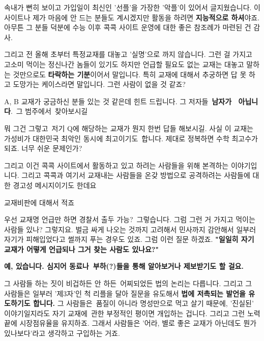 속내가 뻔히 보이고 가입일이 최신인 '선플'을 가장한 '악플'이 있어서 글지웠습니다.
이 사이트나 제가 마음에 안 드는 분들도 계시겠지만 활동을 하려면 \textbf{지능적으로 하셔}야죠.
아무튼 그 분들 덕분에 수능 이후 콕콕 사이트 운영에 대한 좋은 참조례가 마련된 건 감사.
\vspace{5mm}

그리고 전 올해 초부터 특정교재를 대놓고 '실명'으로 까지 않습니다. 그런 걸 가지고 고소미 먹이는 정신나간 놈들이 있기도 하지만
언급할 필요도 없는 교재는 대놓고 말하는 것만으로도 \textbf{타락하는 기분}이어서 말입니다.
특히 교재에 대해서 추궁하면 답 못 하고 도망가는 케이스라면 말입니다. 그런 사람이 없을 것 같죠?
\vspace{5mm}

A, B 교재가 궁금하신 분들 있는 것 같은데 힌트 드립니다.
그 저자들 \textbf{남자가  아닙니다}. 그 범주에서 찾아보시길
\vspace{5mm}

뭐 그건 그렇고 저기 Q에 해당하는 교재가 뭔지 한번 답들 해보시길.
사실 이 교재는 가성비가 대한민국 최악인 동시에 최고이기도 합니다. 제대로 정복하면 수학 최고수가 되죠.
너무 쉬운 문제인가?
\vspace{5mm}

그리고 이건 콕콕 사이트에서 활동하고 있고 하려는 사람들을 위해 본격하는 이야기입니다.
그리고 콕콕과 여기서 교재내는 사람들을 온갖 방법으로 공격하려는 사람들에 대한 경고성 메시지이기도 한데요
\vspace{5mm}

교재비판에 대해서 적죠
\vspace{5mm}

우선 교재명 언급만 하면 경찰서 출두 가능? 그렇습니다.
그럼 그런 거 가지고 먹이는 사람들 있나? 그렇지요.
벌금 싸게 나오는 것까지 고려해서 민사까지 감안해서 일부러 자기가 피해입었다고 썰까지 푸는 경우도 있죠.
그럼 이런 질문 하겠죠. \textbf{"일일히 자기 교재가 어떻게 언급되나 그거 찾는 사람도 있나요?"}
\vspace{5mm}

\textbf{예, 있습니다. 심지어 동료나 부하(?)들을 통해 알아보거나 제보받기도 할 걸요.}
\vspace{5mm}

그 사람들 하는 짓이 비겁하든 안 하든 어찌되었든 법의 논리는 다릅니다.
그리고 그 사람들은 일부러 '제3자'인 척 리플을 달아 질문을 유도해서 \textbf{법에 저촉되는 발언을 유도하기도 합니다.}
그 사람들은 품질이 아니라 명성만으로 먹고 살기 때문에, '진실된' 이야기일지라도 자기 교재에 관한 부정적인 평이면 개입하는 겁니다.
그리고 그런 노력 끝에 시장점유율을 유지하죠. 그래서 사람들은 '어라, 별로 좋은 교재가 아닌데도 뭔가 있나보다'라고 생각하고 구입하는 거죠.
\vspace{5mm}

